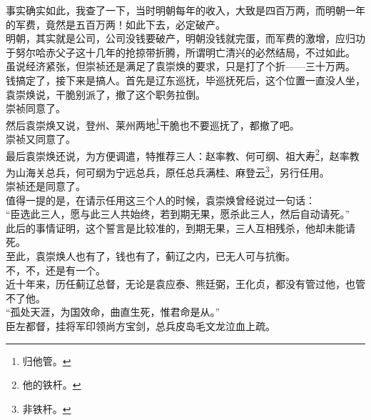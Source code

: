 \begin{multicols}{\theparacolNo}
事实确实如此，我查了一下，当时明朝每年的收入，大致是四百万两，而明朝一年的军费，竟然是五百万两！如此下去，必定破产。\\

明朝，其实就是公司，公司没钱要破产，明朝没钱就完蛋，而军费的激增，应归功于努尔哈赤父子这十几年的抢掠带折腾，所谓明亡清兴的必然结局，不过如此。\\

虽说经济紧张，但崇祯还是满足了袁崇焕的要求，只是打了个折——三十万两。\\

钱搞定了，接下来是搞人。首先是辽东巡抚，毕巡抚死后，这个位置一直没人坐，袁崇焕说，干脆别派了，撤了这个职务拉倒。\\

崇祯同意了。\\

然后袁崇焕又说，登州、莱州两地\footnote{归他管。}干脆也不要巡抚了，都撤了吧。\\

崇祯又同意了。\\

最后袁崇焕还说，为方便调遣，特推荐三人：赵率教、何可纲、祖大寿\footnote{他的铁杆。}，赵率教为山海关总兵，何可纲为宁远总兵，原任总兵满桂、麻登云\footnote{非铁杆。}，另行任用。\\

崇祯还是同意了。\\

值得一提的是，在请示任用这三个人的时候，袁崇焕曾经说过一句话：\\

“臣选此三人，愿与此三人共始终，若到期无果，愿杀此三人，然后自动请死。”\\

此后的事情证明，这个誓言是比较准的，到期无果，三人互相残杀，他却未能请死。\\

至此，袁崇焕人也有了，钱也有了，蓟辽之内，已无人可与抗衡。\\

不，不，还是有一个。\\

近十年来，历任蓟辽总督，无论是袁应泰、熊廷弼，王化贞，都没有管过他，也管不了他。\\

“孤处天涯，为国效命，曲直生死，惟君命是从。”\\

臣左都督，挂将军印领尚方宝剑，总兵皮岛毛文龙泣血上疏。\\


\end{multicols}
